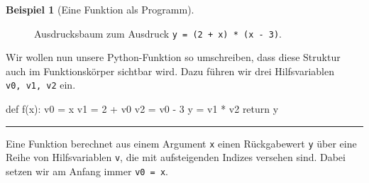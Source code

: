 \documentclass[
  letterpaper,
  DIV=11,
  oneside]{scrreprt}
\newenvironment{Shaded}{\begin{snugshade}}{\end{snugshade}}
\newcommand{\ControlFlowTok}[1]{\textcolor[rgb]{0.00,0.23,0.31}{#1}}
\newcommand{\DecValTok}[1]{\textcolor[rgb]{0.68,0.00,0.00}{#1}}
\newcommand{\KeywordTok}[1]{\textcolor[rgb]{0.00,0.23,0.31}{#1}}
\newcommand{\NormalTok}[1]{\textcolor[rgb]{0.00,0.23,0.31}{#1}}
\newcommand{\OperatorTok}[1]{\textcolor[rgb]{0.37,0.37,0.37}{#1}}
\theoremstyle{definition}
\theoremstyle{definition}
\newtheorem{example}{Beispiel}[chapter]
\theoremstyle{remark}
\begin{document}
\begin{example}[Eine Funktion als
Programm]
\begin{figure}
{\begin{figure}[H]
{}

\end{figure}

}

\caption{\label{fig-compTreeSimple}Ausdrucksbaum zum Ausdruck
\texttt{y\ =\ (2\ +\ x)\ *\ (x\ -\ 3)}.}

\end{figure}

Wir wollen nun unsere Python-Funktion so umschreiben, dass diese
Struktur auch im Funktionskörper sichtbar wird. Dazu führen wir drei
Hilfsvariablen \texttt{v0,\ v1,\ v2} ein.

\begin{Shaded}
\begin{Highlighting}[]
\KeywordTok{def}\NormalTok{ f(x):}
\NormalTok{    v0 }\OperatorTok{=}\NormalTok{ x}
\NormalTok{    v1 }\OperatorTok{=} \DecValTok{2} \OperatorTok{+}\NormalTok{ v0}
\NormalTok{    v2 }\OperatorTok{=}\NormalTok{ v0 }\OperatorTok{{-}} \DecValTok{3}
\NormalTok{    y }\OperatorTok{=}\NormalTok{ v1 }\OperatorTok{*}\NormalTok{ v2}
    \ControlFlowTok{return}\NormalTok{ y}
\end{Highlighting}
\end{Shaded}

\end{example}

\begin{center}\rule{0.5\linewidth}{0.5pt}\end{center}

\begin{tcolorbox}[enhanced jigsaw, title=\textcolor{quarto-callout-important-color}{\faExclamation}\hspace{0.5em}{Konvention}, colbacktitle=quarto-callout-important-color!10!white, bottomrule=.15mm, titlerule=0mm, colback=white, breakable, colframe=quarto-callout-important-color-frame, bottomtitle=1mm, toptitle=1mm, leftrule=.75mm, arc=.35mm, left=2mm, rightrule=.15mm, toprule=.15mm, opacitybacktitle=0.6, opacityback=0, coltitle=black]
Eine Funktion berechnet aus einem Argument \texttt{x} einen Rückgabewert
\texttt{y} über eine Reihe von Hilfsvariablen \texttt{v}, die mit
aufsteigenden Indizes versehen sind. Dabei setzen wir am Anfang immer
\texttt{v0\ =\ x}.
\end{tcolorbox}
\end{document}
